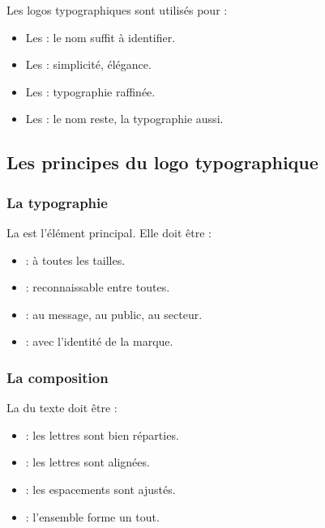 Les logos typographiques sont utilisés pour :

\begin{itemize}
    \item Les  : le nom suffit à identifier.
    \item Les  : simplicité, élégance.
    \item Les  : typographie raffinée.
    \item Les  : le nom reste, la typographie aussi.
\end{itemize}

\subsection{Les principes du logo typographique}

\subsubsection{La typographie}

La  est l'élément principal. Elle doit être :

\begin{itemize}
    \item {} : à toutes les tailles.
    \item {} : reconnaissable entre toutes.
    \item {} : au message, au public, au secteur.
    \item {} : avec l'identité de la marque.
\end{itemize}

\subsubsection{La composition}

La  du texte doit être :

\begin{itemize}
    \item {} : les lettres sont bien réparties.
    \item {} : les lettres sont alignées.
    \item {} : les espacements sont ajustés.
    \item {} : l'ensemble forme un tout.
\end{itemize}

